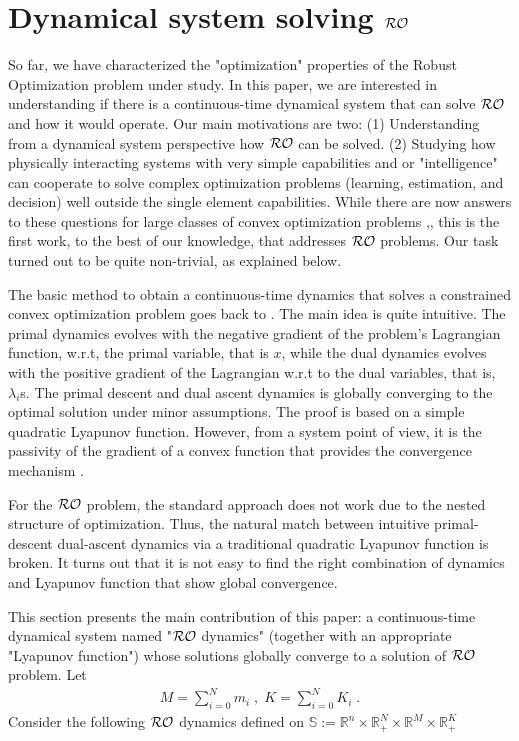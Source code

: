 \documentclass[journal,twoside,web]{ieeecolor}
\begin{document}
\section{Dynamical system solving ${\cal RO}$} \label{section_pddynamics}

So far,  we have characterized the "optimization" properties of the Robust Optimization problem under study.  In this paper, we are interested in understanding if there is a continuous-time dynamical system that can solve ${\cal RO}$ and how it would operate. Our main motivations are two: (1) Understanding from a dynamical system perspective how ${\cal RO}$ can be solved. (2) Studying how physically interacting systems with very simple capabilities and or "intelligence" can cooperate to solve complex optimization problems (learning, estimation, and decision) well outside the single element capabilities. While there are now answers to these questions for large classes of convex optimization problems \cite{feijer2010},\cite{wang2011}, this is the first work, to the best of our knowledge, that addresses ${\cal RO}$ problems. Our task turned out to be quite non-trivial, as explained below.

The basic method to obtain a continuous-time dynamics that solves a constrained convex optimization problem goes back to \cite{arrow1958}. The main idea is quite intuitive. The primal dynamics evolves with the negative gradient of the problem's Lagrangian function, w.r.t, the primal variable, that is $x$, while the dual dynamics evolves with the positive gradient of the Lagrangian w.r.t to the dual variables, that is, $\lambda_i$s. The primal descent and dual ascent dynamics is globally converging to the optimal solution under minor assumptions. The proof is based on a simple quadratic Lyapunov function. However, from a system point of view, it is the passivity of the gradient of a convex function that provides the convergence mechanism \cite{simpson2016,kosaraju2018}.

For the ${\cal RO}$ problem, the standard approach does not work due to the nested structure of optimization. Thus, the natural match between intuitive primal-descent dual-ascent dynamics via a traditional quadratic Lyapunov function is broken. It turns out that it is not easy to find the right combination of dynamics and Lyapunov function that show global convergence.

This section presents the main contribution of this paper: a continuous-time dynamical system named "${\cal RO}$ dynamics" (together with an appropriate "Lyapunov function") whose solutions globally converge to a solution of ${\cal RO}$ problem. Let
\begin{align*}
M=\sum_{i=0}^{N}m_i\;,\; K=\sum_{i=0}^{N}K_i\;.
\end{align*}
Consider the following ${\cal RO}$ dynamics defined on $\mathbb{S}:= \mathbb{R}^n \times \mathbb{R}^N_{+} \times \mathbb{R}^M \times \mathbb{R}^K_+$\;
\end{document}
